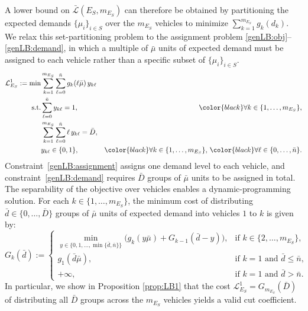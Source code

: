 \documentclass{article}
\newcommand{\rev}[1]{{\color{black}#1}}
\begin{document}
A lower bound on $\bar{\mathcal{L}}(E_S, m_{E_S})$ can therefore be obtained by partitioning the expected demands $\{\mu_i\}_{i \in S}$ over the $m_{E_S}$ vehicles to minimize $\sum_{k=1}^{m_{E_S}} g_k(d_k)$. \rev{We relax this set-partitioning problem to the assignment problem \eqref{genLB:obj}--\eqref{genLB:demand}, in which a multiple of $\bar{\mu}$ units of expected demand must be assigned to each vehicle rather than a specific subset of $\{\mu_i\}_{i \in S}$.}
\begingroup
\allowdisplaybreaks
\begin{align}
    \mathcal{L}^1_{E_S} := \min & \sum_{k=1}^{m_{E_S}} \sum_{\ell=0}^{\bar n} g_k(\ell \bar\mu) \, y_{k\ell} \label{genLB:obj} \\
    \text{s.t.} & \sum_{\ell=0}^{\bar n} y_{k\ell} = 1, & \rev{\forall} k \in \{1,\dots,m_{E_S}\}, \label{genLB:assignment} \\
    & \sum_{k=1}^{m_{E_S}} \sum_{\ell=0}^{\bar n} \ell \, y_{k\ell} = \bar D, \label{genLB:demand} \\
    & y_{k\ell} \in \{0,1\}, & \rev{\forall} k \in \{1,\dots,m_{E_S}\},\, \rev{\forall} \ell \in \{0,\dots,\bar n\}. \label{genLB:vars_y}
\end{align}
\endgroup
\rev{Constraint~\eqref{genLB:assignment} assigns one demand level to each vehicle, and constraint~\eqref{genLB:demand} requires $\bar D$ groups of $\bar\mu$ units to be assigned in total.} The separability of the objective over vehicles enables a dynamic-programming solution. For each $k \in \{1,\dots,m_{E_S}\}$, the minimum cost of distributing $\bar d \in \{0,\dots,\bar D\}$ groups of $\bar\mu$ units of expected demand into vehicles $1$ to $k$ is given by:
\begin{equation}\label{LB_kd_DP}
G_{k}(\bar{d}) := \begin{cases}
        \min\limits_{y \in \{0,1,\dots,\min\{\bar{d}, \bar{n}\}\}}
        \bigl(g_{k}(y\bar{\mu}) + G_{k-1}(\bar{d}-y)\bigr),
        & \text{if } k \in \{2,\dots,m_{E_S}\},\\[2pt]
        g_{1}(\bar{d}\bar{\mu}),
        & \text{if } k = 1 \text{ and } \bar{d} \leq \bar{n},\\
        +\infty,
        & \text{if } k = 1 \text{ and } \bar{d} > \bar{n}.
    \end{cases}
\end{equation}
In particular, \rev{we show in Proposition \ref{prop:LB1}} that the cost $\mathcal{L}^1_{E_S} = G_{m_{E_S}}(\bar D)$ \rev{of distributing all $\bar D$ groups across the $m_{E_S}$ vehicles yields a valid cut coefficient.}
 
\end{document}
